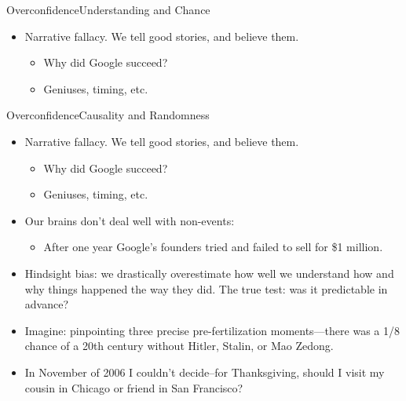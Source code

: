 \documentclass{beamer}
\begin{document}
\begin{frame}{Overconfidence}{Understanding and Chance}
\begin{itemize}
\addtolength{\itemsep}{0.5\baselineskip}
\item Narrative fallacy. We tell good stories, and believe them.
  \begin{itemize}
  \item Why did Google succeed?
  \item Geniuses, timing, etc.
  \end{itemize}
\end{itemize}
\end{frame}

\begin{frame}{Overconfidence}{Causality and Randomness}
\begin{itemize}
\addtolength{\itemsep}{0.5\baselineskip}
\item Narrative fallacy. We tell good stories, and believe them.
  \begin{itemize}
  \addtolength{\itemsep}{0.5\baselineskip}
  \item Why did Google succeed?
  \item Geniuses, timing, etc.
  \end{itemize}
\item Our brains don't deal well with non-events: 
  \begin{itemize}
  \item After one year Google's founders tried and failed to sell for \$1 million.
  \end{itemize}
\item Hindsight bias: we drastically overestimate how well we understand how and why things happened the way they did. The true test: was it predictable in advance?
\item Imagine: pinpointing three precise pre-fertilization moments---there was a 1/8 chance of a 20th century without Hitler, Stalin, or Mao Zedong. 
\item In November of 2006 I couldn't decide--for Thanksgiving, should I visit my cousin in Chicago or friend in San Francisco?
\end{itemize}
\end{frame}
\end{document}
